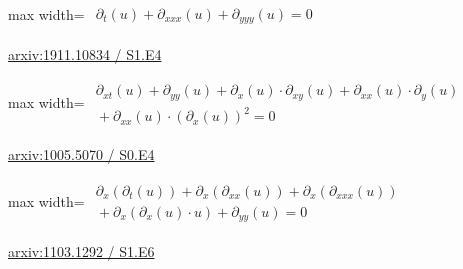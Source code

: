 \documentclass[10pt,a4paper]{article}
\begin{document}
\begin{minipage}{\linewidth}
\begin{center}\begin{adjustbox}{max width=\linewidth}$\displaystyle\begin{gathered}\begin{gathered}\partial_{t}(u)+\partial_{xxx}(u)+\partial_{yyy}(u)=0\end{gathered}\end{gathered}$\end{adjustbox}\end{center}
{\small \href{https://arxiv.org/html/1911.10834#S1.E4}{arxiv:1911.10834 / S1.E4}}\par
\end{minipage}\par\vspace{7mm}

\begin{minipage}{\linewidth}
\begin{center}\begin{adjustbox}{max width=\linewidth}$\displaystyle\begin{gathered}\begin{gathered}\partial_{xt}(u)+\partial_{yy}(u)+\partial_{x}(u)\cdot \partial_{xy}(u)+\partial_{xx}(u)\cdot \partial_{y}(u)\\[-1pt]{}+\partial_{xx}(u)\cdot (\partial_{x}(u))^{2}=0\end{gathered}\end{gathered}$\end{adjustbox}\end{center}
{\small \href{https://arxiv.org/html/1005.5070#S0.E4}{arxiv:1005.5070 / S0.E4}}\par
\end{minipage}\par\vspace{7mm}

\begin{minipage}{\linewidth}
\begin{center}\begin{adjustbox}{max width=\linewidth}$\displaystyle\begin{gathered}\begin{gathered}\partial_{x}(\partial_{t}(u))+\partial_{x}(\partial_{xx}(u))+\partial_{x}(\partial_{xxx}(u))\\[-1pt]{}+\partial_{x}(\partial_{x}(u)\cdot u)+\partial_{yy}(u)=0\end{gathered}\end{gathered}$\end{adjustbox}\end{center}
{\small \href{https://arxiv.org/html/1103.1292#S1.E6}{arxiv:1103.1292 / S1.E6}}\par
\end{minipage}\par\vspace{7mm}
\end{document}
